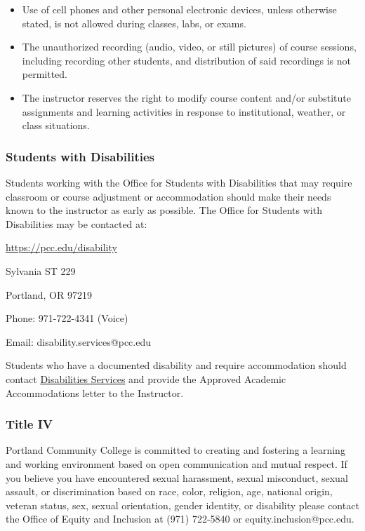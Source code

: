 \documentclass[11pt]{article}
\begin{document}
\begin{itemize}
\item
  Use of cell phones and other personal electronic devices, unless
  otherwise stated, is not allowed during classes, labs, or exams.
\item
  The unauthorized recording (audio, video, or still pictures) of course
  sessions, including recording other students, and distribution of said
  recordings is not permitted.
\item
  The instructor reserves the right to modify course content and/or
  substitute assignments and learning activities in response to
  institutional, weather, or class situations.
\end{itemize}

    \hypertarget{students-with-disabilities}{%
\subsubsection{Students with
Disabilities}\label{students-with-disabilities}}

Students working with the Office for Students with Disabilities that may
require classroom or course adjustment or accommodation should make
their needs known to the instructor as early as possible. The Office for
Students with Disabilities may be contacted at:

\url{https://pcc.edu/disability}

Sylvania ST 229

Portland, OR 97219

Phone: 971-722-4341 (Voice)

Email: disability.services@pcc.edu

Students who have a documented disability and require accommodation
should contact
\href{http://www.pcc.edu/resources/disability}{Disabilities Services}
and provide the Approved Academic Accommodations letter to the
Instructor.

    \hypertarget{title-iv}{%
\subsubsection{Title IV}\label{title-iv}}

Portland Community College is committed to creating and fostering a
learning and working environment based on open communication and mutual
respect. If you believe you have encountered sexual harassment, sexual
misconduct, sexual assault, or discrimination based on race, color,
religion, age, national origin, veteran status, sex, sexual orientation,
gender identity, or disability please contact the Office of Equity and
Inclusion at (971) 722-5840 or equity.inclusion@pcc.edu.
\end{document}
